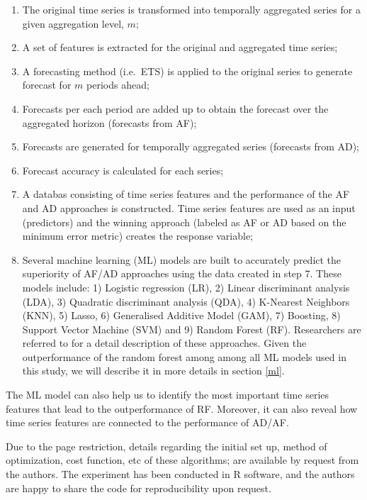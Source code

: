 \documentclass[]{elsarticle} %
\begin{document}
\begin{enumerate}
\def\labelenumi{\arabic{enumi}.}
\item
  The original time series is transformed into temporally aggregated
  series for a given aggregation level, \(m\);
\item
  A set of features is extracted for the original and aggregated time
  series;
\item
  A forecasting method (i.e.~ETS) is applied to the original series to
  generate forecast for \(m\) periods ahead;
\item
  Forecasts per each period are added up to obtain the forecast over the
  aggregated horizon (forecasts from AF);
\item
  Forecasts are generated for temporally aggregated series (forecasts
  from AD);
\item
  Forecast accuracy is calculated for each series;
\item
  A databas consisting of time series features and the performance of
  the AF and AD approaches is constructed. Time series features are used
  as an input (predictors) and the winning approach (labeled as AF or AD
  based on the minimum error metric) creates the response variable;
\item
  Several machine learning (ML) models are built to accurately predict
  the superiority of AF/AD approaches using the data created in step 7.
  These models include: 1) Logistic regression (LR), 2) Linear
  discriminant analysis (LDA), 3) Quadratic discriminant analysis (QDA),
  4) K-Nearest Neighbors (KNN), 5) Lasso, 6) Generalised Additive Model
  (GAM), 7) Boosting, 8) Support Vector Machine (SVM) and 9) Random
  Forest (RF). Researchers are referred to \citet{james2021statistical}
  for a detail description of these approaches. Given the outperformance
  of the random forest among among all ML models used in this study, we
  will describe it in more details in section \ref{ml}.
\end{enumerate}

The ML model can also help us to identify the most important time series
features that lead to the outperformance of RF. Moreover, it can also
reveal how time series features are connected to the performance of
AD/AF.

Due to the page restriction, details regarding the initial set up,
method of optimization, cost function, etc of these algorithms; are
available by request from the authors. The experiment has been conducted
in R software, and the authors are happy to share the code for
reproducibility upon request.
\end{document}
